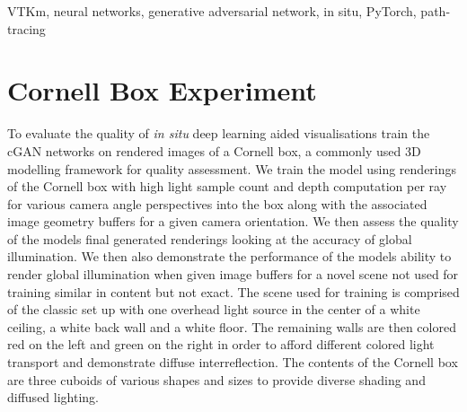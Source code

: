 \documentclass[conference]{IEEEtran}
\begin{document}
\begin{IEEEkeywords}
    VTKm, neural networks, generative adversarial network, in situ, PyTorch, path-tracing
\end{IEEEkeywords}

\newcommand{\markcomment}[1]{\textcolor{red}{#1}}










\section{Cornell Box Experiment}

To evaluate the quality of \textit{in situ} deep learning aided visualisations train the cGAN networks on rendered images of a Cornell box, a commonly used 3D modelling framework for quality assessment. We train the model using renderings of the Cornell box with high light sample count and depth computation per ray for various camera angle perspectives into the box along with the associated image geometry buffers for a given camera orientation. We then assess the quality of the models final generated renderings looking at the accuracy of global illumination. We then also demonstrate the performance of the models ability to render global illumination when given image buffers for a novel scene not used for training similar in content but not exact. The scene used for training is comprised of the classic set up with one overhead light source in the center of a white ceiling, a white back wall and a white floor. The remaining walls are then colored red on the left and green on the right in order to afford different colored light transport and demonstrate diffuse interreflection. The contents of the Cornell box are three cuboids of various shapes and sizes to provide diverse shading and diffused lighting. 
\end{document}
